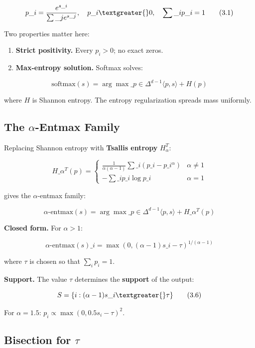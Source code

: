\[
p\_i = \frac{e^{s\_i}}{\sum\_j e^{s\_j}}, \quad p\_i \textgreater{} 0, \quad \sum\_i p\_i = 1
\tag{3.1}
\]

Two properties matter here:

\begin{enumerate}
\item \textbf{Strict positivity.} Every $p_i > 0$; no exact zeros.
\item \textbf{Max-entropy solution.} Softmax solves:

\end{enumerate}
\[
\text{softmax}(s) = \arg\max\_{p \in \Delta^{d-1}} \langle p, s \rangle + H(p)
\tag{3.2}
\]

where $H$ is Shannon entropy. The entropy regularization spreads mass 
uniformly.

\subsection{The $\alpha$-Entmax Family}

Replacing Shannon entropy with \textbf{Tsallis entropy} $H_\alpha^T$:

\[
H\_\alpha^T(p) = \begin{cases}
\frac{1}{\alpha (\alpha - 1)} \sum\_i (p\_i - p\_i^\alpha) & \alpha \neq 1 \\
-\sum\_i p\_i \log p\_i & \alpha = 1
\end{cases}
\tag{3.3}
\]

gives the $\alpha$-entmax family:

\[
\text{$\alpha$-entmax}(s) = \arg\max\_{p \in \Delta^{d-1}} \langle p, s \rangle + H\_\alpha^T(p)
\tag{3.4}
\]

\textbf{Closed form.} For $\alpha > 1$:

\[
\text{$\alpha$-entmax}(s)\_i = \max\!\left(0, (\alpha - 1) s\_i - \tau\right)^{1/(\alpha - 1)}
\tag{3.5}
\]

where $\tau$ is chosen so that $\sum_i p_i = 1$.

\textbf{Support.} The value $\tau$ determines the \textbf{support} of the output:

\[
S = \{i : (\alpha - 1) s\_i \textgreater{} \tau\}
\tag{3.6}
\]

For $\alpha = 1.5$: $p_i \propto \max(0, 0.5 s_i - \tau)^2$.

\subsection{Bisection for $\tau$}

